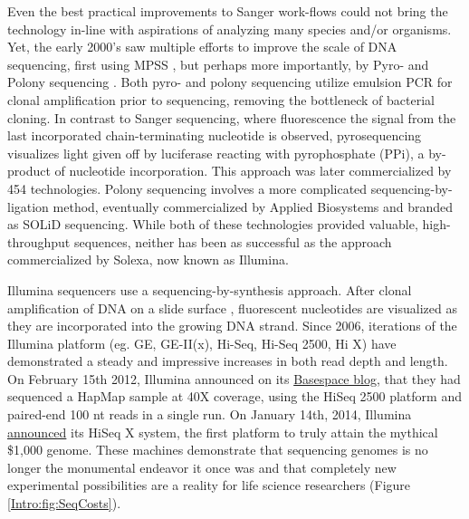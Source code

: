     Even the best practical improvements to Sanger work-flows could not bring the technology in-line with aspirations of analyzing many species and/or organisms. Yet, the early 2000's saw multiple efforts to improve the scale of DNA sequencing, first using MPSS \citep{Brenner2000a}, but perhaps more importantly, by Pyro- \citep{Ronaghi1998a} and Polony sequencing \citep{Shendure2005}. Both pyro- and polony sequencing utilize emulsion PCR \citep{Nakano2003a} for clonal amplification prior to sequencing, removing the bottleneck of bacterial cloning. In contrast to Sanger sequencing, where fluorescence the signal from the last incorporated chain-terminating nucleotide is observed, pyrosequencing visualizes light given off by luciferase reacting with pyrophosphate (PPi), a by-product of nucleotide incorporation. This approach was later commercialized by 454 technologies. Polony sequencing involves a more complicated sequencing-by-ligation method, eventually commercialized by Applied Biosystems and branded as SOLiD sequencing. While both of these technologies provided valuable, high-throughput sequences, neither has been as successful as the approach commercialized by Solexa, now known as Illumina.

    Illumina sequencers use a sequencing-by-synthesis approach. After clonal amplification of DNA on a slide surface \citep{Bentley2008}, fluorescent nucleotides are visualized as they are incorporated into the growing DNA strand. Since 2006, iterations of the Illumina platform (eg. GE, GE-II(x), Hi-Seq, Hi-Seq 2500, Hi X) have demonstrated a steady and impressive increases in both read depth and length. On February 15th 2012, Illumina announced on its \href{http://blog.basespace.illumina.com/}{Basespace blog}, that they had sequenced a HapMap sample at 40X coverage, using the HiSeq 2500 platform and paired-end 100 nt reads in a single run. On January 14th, 2014, Illumina \href{http://bit.ly/PZpegZ}{announced} its HiSeq X system, the first platform to truly attain the mythical \$1,000 genome. These machines demonstrate that sequencing genomes is no longer the monumental endeavor it once was and that completely new experimental possibilities are a reality for life science researchers (Figure \ref{Intro:fig:SeqCosts}).

